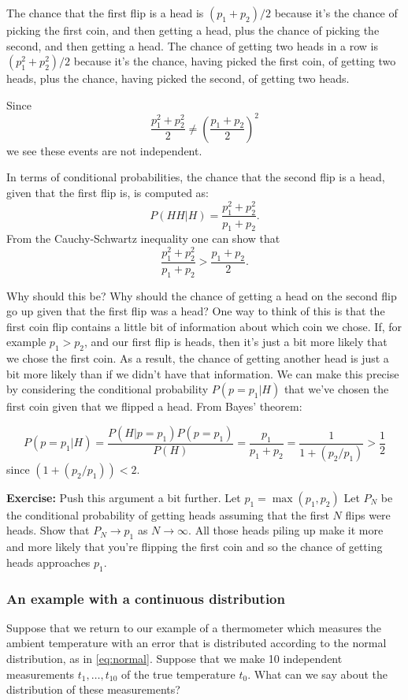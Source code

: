 \documentclass[
  oneside]{scrbook}
\begin{document}
The chance that the first flip is a head is \((p_1+p_2)/2\) because it's
the chance of picking the first coin, and then getting a head, plus the
chance of picking the second, and then getting a head. The chance of
getting two heads in a row is \((p_1^2+p_2^2)/2\) because it's the
chance, having picked the first coin, of getting two heads, plus the
chance, having picked the second, of getting two heads.

Since \[
\frac{p_1^2+p_2^2}{2}\not=\left(\frac{p_1+p_2}{2}\right)^2
\] we see these events are not independent.

In terms of conditional probabilities, the chance that the second flip
is a head, given that the first flip is, is computed as: \[
P(HH|H) = \frac{p_1^2+p_2^2}{p_1+p_2}.
\] From the Cauchy-Schwartz inequality one can show that \[
\frac{p_1^2+p_2^2}{p_1+p_2}>\frac{p_1+p_2}{2}.
\]

Why should this be? Why should the chance of getting a head on the
second flip go up given that the first flip was a head? One way to think
of this is that the first coin flip contains a little bit of information
about which coin we chose. If, for example \(p_1>p_2\), and our first
flip is heads, then it's just a bit more likely that we chose the first
coin. As a result, the chance of getting another head is just a bit more
likely than if we didn't have that information. We can make this precise
by considering the conditional probability \(P(p=p_1|H)\) that we've
chosen the first coin given that we flipped a head. From Bayes' theorem:

\[
P(p=p_1|H) = \frac{P(H|p=p_1)P(p=p_1)}{P(H)}=\frac{p_1}{p_1+p_2}=\frac{1}{1+(p_2/p_1)}>\frac{1}{2}
\] since \((1+(p_2/p_1))<2\).

\textbf{Exercise:} Push this argument a bit further. Let
\(p_1=\max(p_1,p_2)\) Let \(P_N\) be the conditional probability of
getting heads assuming that the first \(N\) flips were heads. Show that
\(P_N\to p_1\) as \(N\to\infty\). All those heads piling up make it more
and more likely that you're flipping the first coin and so the chance of
getting heads approaches \(p_1\).

\hypertarget{an-example-with-a-continuous-distribution}{%
\subsubsection{An example with a continuous
distribution}\label{an-example-with-a-continuous-distribution}}

Suppose that we return to our example of a thermometer which measures
the ambient temperature with an error that is distributed according to
the normal distribution, as in \cref{eq:normal}. Suppose that we make 10
independent measurements \(t_1,\ldots, t_{10}\) of the true temperature
\(t_0\). What can we say about the distribution of these measurements?
\end{document}
